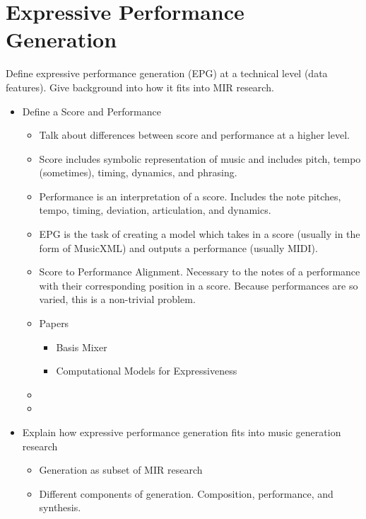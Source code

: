 \section{Expressive Performance Generation}
Define expressive performance generation (EPG) at a technical level (data features). Give background into how it fits into MIR research. 
\begin{itemize}
    \item Define a Score and Performance
    \begin{itemize}
        \item Talk about differences between score and performance at a higher level.
        \item Score includes symbolic representation of music and includes pitch, tempo (sometimes), timing, dynamics, and phrasing. 
        \item Performance is an interpretation of a score. Includes the note pitches, tempo, timing, deviation, articulation, and dynamics. 
        \item EPG is the task of creating a model which takes in a score (usually in the form of MusicXML) and outputs a performance (usually MIDI). 
        \item Score to Performance Alignment. Necessary to the notes of a performance with their corresponding position in a score. Because performances are so varied, this is a non-trivial problem. 
        \item Papers 
        \begin{itemize}
            \item Basis Mixer \cite{eduardo2018computational}
            \item Computational Models for Expressiveness \cite{cancino2018computational}
        \end{itemize}
        \item {}
        \item {}
    \end{itemize}
    \item Explain how expressive performance generation fits into music generation research
    \begin{itemize}
        \item Generation as subset of MIR research 
        \item Different components of generation. Composition, performance, and synthesis. 

\end{itemize}
\end{itemize}

